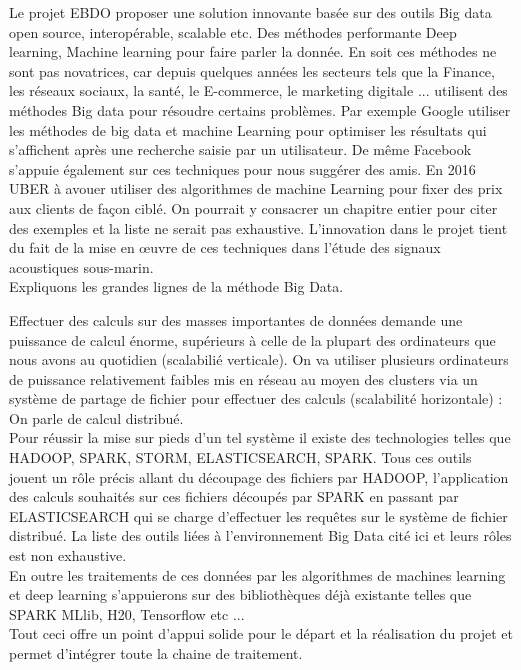\documentclass[a4paper]{article}
\begin{document}
Le projet EBDO proposer une solution innovante basée sur des outils Big data open source,
interopérable, scalable etc. Des méthodes performante Deep learning, Machine learning pour
faire parler la donnée. En soit ces méthodes ne sont pas novatrices, car depuis quelques années
les secteurs tels que la Finance, les réseaux sociaux, la santé, le E-commerce, le marketing
digitale ... utilisent des méthodes Big data pour résoudre certains problèmes. Par exemple
Google utiliser les méthodes de big data et machine Learning pour optimiser les résultats qui
s’affichent après une recherche saisie par un utilisateur. De même Facebook s’appuie également
sur ces techniques pour nous suggérer des amis. En 2016 UBER à avouer utiliser des
algorithmes de machine Learning pour fixer des prix aux clients de façon ciblé. On pourrait y
consacrer un chapitre entier pour citer des exemples et la liste ne serait pas exhaustive.
L’innovation dans le projet tient du fait de la mise en œuvre de ces techniques dans l’étude des
signaux acoustiques sous-marin.
\\

Expliquons les grandes lignes de la méthode Big Data.


Effectuer des calculs sur des masses importantes de données demande une puissance de calcul
énorme, supérieurs à celle de la plupart des ordinateurs que nous avons au quotidien (scalabilié
verticale). On va utiliser plusieurs ordinateurs de puissance relativement faibles mis en réseau
au moyen des clusters via un système de partage de fichier pour effectuer des calculs
(scalabilité horizontale) : On parle de calcul distribué.
\\

Pour réussir la mise sur pieds d’un tel système il existe des technologies telles que HADOOP,
SPARK, STORM, ELASTICSEARCH, SPARK. Tous ces outils jouent un rôle précis allant du
découpage des fichiers par HADOOP, l’application des calculs souhaités sur ces fichiers
découpés par SPARK en passant par ELASTICSEARCH qui se charge d’effectuer les requêtes sur
le système de fichier distribué. La liste des outils liées à l’environnement Big Data cité ici et
leurs rôles est non exhaustive.
\\

En outre les traitements de ces données par les algorithmes de machines learning et deep
learning s’appuierons sur des bibliothèques déjà existante telles que SPARK MLlib, H20,
Tensorflow etc ...
\\

Tout ceci offre un point d’appui solide pour le départ et la réalisation du projet et permet
d’intégrer toute la chaine de traitement.
\end{document}
